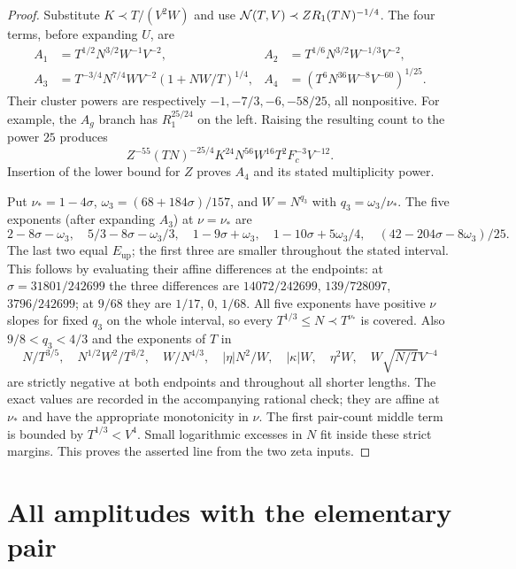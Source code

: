 \begin{proof}
Substitute $K\prec T/(V^2W)$ and use
$\mathcal{N}(T,V)\prec ZR_1(TN)^{-1/4}$.
The four terms, before expanding $U$, are
\begin{align*}
 A_1&=T^{1/2}N^{3/2}W^{-1}V^{-2},&
 A_2&=T^{1/6}N^{3/2}W^{-1/3}V^{-2},\\
 A_3&=T^{-3/4}N^{7/4}WV^{-2}(1+NW/T)^{1/4},&
 A_4&=(T^6N^{36}W^{-8}V^{-60})^{1/25}.
\end{align*}
Their cluster powers are respectively
$-1,-7/3,-6,-58/25$, all nonpositive. For example, the $A_g$ branch
has $R_1^{25/24}$ on the left. Raising the resulting count to the power $25$
produces
\[ Z^{-55}(TN)^{-25/4}K^{24}N^{56}W^{16}T^2F_c^{-3}V^{-12}. \]
Insertion of the lower bound for $Z$ proves $A_4$
and its stated multiplicity power.

Put $\nu_*=1-4\sigma$, $\omega_3=(68+184\sigma)/157$, and
$W=N^{q_3}$ with $q_3=\omega_3/\nu_*$. The five exponents
(after expanding $A_3$) at $\nu=\nu_*$ are
\[
 2-8\sigma-\omega_3,\quad 5/3-8\sigma-\omega_3/3,\quad
 1-9\sigma+\omega_3,\quad 1-10\sigma+5\omega_3/4,\quad
 (42-204\sigma-8\omega_3)/25.
\]
The last two equal $E_{\mathrm{up}}$; the first three are smaller throughout the
stated interval. This follows by evaluating their affine differences
at the endpoints: at $\sigma=31801/242699$ the three differences
are $14072/242699$, $139/728097$, $3796/242699$; at $9/68$ they are
$1/17$, $0$, $1/68$.
All five exponents have positive $\nu$ slopes for fixed $q_3$ on the
whole interval, so every $T^{1/3}\le N\prec T^{\nu_*}$ is covered.
Also $9/8<q_3<4/3$ and the exponents of $T$ in
\[
 N/T^{3/5},\quad N^{1/2}W^2/T^{3/2},\quad W/N^{4/3},\quad
 |\eta|N^2/W,\quad |\kappa|W,\quad\eta^2W,\quad
 W\sqrt{N/T}V^{-4}
\]
are strictly negative at both endpoints and throughout all shorter
lengths. The exact values are recorded in the accompanying rational
check; they are affine at $\nu_*$ and have the appropriate monotonicity
in $\nu$. The first pair-count middle term is bounded by
$T^{1/3}<V^4$. Small logarithmic excesses in $N$ fit inside these
strict margins. This proves the asserted line from the two zeta inputs.
\end{proof}

\raggedbottom
\section{All amplitudes with the elementary pair}
\label{app:elementaryassembly}

